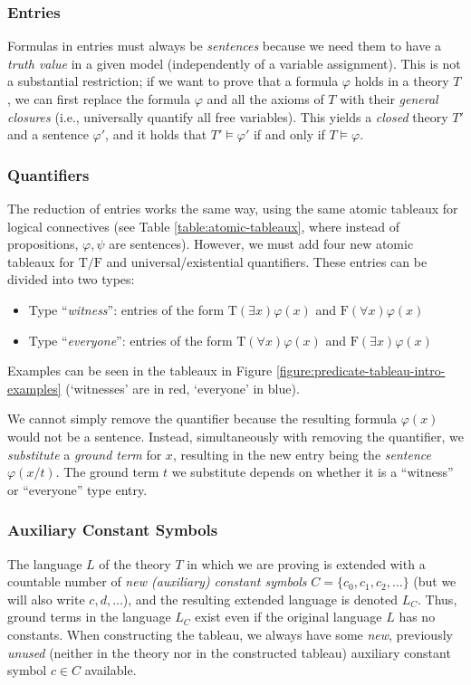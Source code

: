 \subsubsection{Entries}
Formulas in entries must always be \emph{sentences} because we need them to have a \emph{truth value} in a given model (independently of a variable assignment). This is not a substantial restriction; if we want to prove that a formula $\varphi$ holds in a theory $T$, we can first replace the formula $\varphi$ and all the axioms of $T$ with their \emph{general closures} (i.e., universally quantify all free variables). This yields a \emph{closed} theory $T'$ and a sentence $\varphi'$, and it holds that $T'\models\varphi'$ if and only if $T\models\varphi$.

\subsubsection{Quantifiers}
The reduction of entries works the same way, using the same atomic tableaux for logical connectives (see Table \ref{table:atomic-tableaux}, where instead of propositions, $\varphi,\psi$ are sentences). However, we must add four new atomic tableaux for $\mathrm T/\mathrm F$ and universal/existential quantifiers. These entries can be divided into two types:
\begin{itemize}
    \item Type ``\emph{witness}'': entries of the form $\mathrm{T}(\exists x)\varphi(x)$ and $\mathrm{F}(\forall x)\varphi(x)$
    \item Type ``\emph{everyone}'': entries of the form $\mathrm{T}(\forall x)\varphi(x)$ and $\mathrm{F}(\exists x)\varphi(x)$    
\end{itemize}
Examples can be seen in the tableaux in Figure \ref{figure:predicate-tableau-intro-examples} (`witnesses' are in red, `everyone' in blue).

We cannot simply remove the quantifier because the resulting formula $\varphi(x)$ would not be a sentence. Instead, simultaneously with removing the quantifier, we \emph{substitute} a \emph{ground term} for $x$, resulting in the new entry being the \emph{sentence} $\varphi(x/t)$. The ground term $t$ we substitute depends on whether it is a ``witness'' or ``everyone'' type entry.

\subsubsection{Auxiliary Constant Symbols}
The language $L$ of the theory $T$ in which we are proving is extended with a countable number of \emph{new (auxiliary) constant symbols} $C=\{c_0,c_1,c_2,\dots\}$ (but we will also write $c,d,\dots$), and the resulting extended language is denoted $L_C$. Thus, ground terms in the language $L_C$ exist even if the original language $L$ has no constants. When constructing the tableau, we always have some \emph{new}, previously \emph{unused} (neither in the theory nor in the constructed tableau) auxiliary constant symbol $c\in C$ available.

